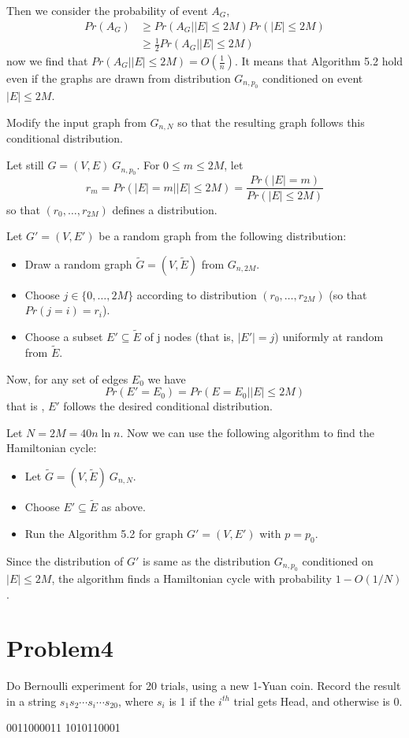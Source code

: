 \documentclass[12pt]{article}
\begin{document}
Then we consider the probability of event $A_G$,
\begin{equation}
    \begin{split}
    Pr(A_G) &\ge Pr(A_G | |E| \le 2M) Pr( |E| \le 2M)\\
    &\ge \frac{1}{2} Pr(A_G | |E| \le 2M)
    \end{split}
\end{equation}
now we find that $Pr(A_G | |E| \le 2M)=O(\frac{1}{n})$. It means that Algorithm 5.2 hold even if the graphs are drawn from distribution $G_{n,p_0}$ conditioned on event $|E| \le 2M$.

Modify the input graph from $G_{n,N}$ so that the resulting graph follows this conditional distribution.

Let still $G=(V,E) ~ G_{n, p_0}$. For $0\le m\le 2M$, let
\begin{equation}
    r_m=Pr(|E| = m | |E|\le 2M) = \frac{Pr(|E|=m)}{Pr(|E|\le 2M)}
\end{equation}
so that $(r_0, \dots, r_{2M})$ defines a distribution.

Let $G' = (V, E')$ be a random graph from the following distribution:
\begin{itemize}
    \item Draw a random graph $\tilde{G} = (V, \tilde{E})$ from $G_{n, 2M}$.
    \item Choose $j \in \{0,\dots, 2M\}$ according to distribution $(r_0, \dots, r_{2M})$ (so that $Pr(j=i)=r_i$).
    \item Choose a subset $E' \subseteq \tilde{E}$ of j nodes (that is, $|E'|=j$) uniformly at random from $\tilde{E}$.
\end{itemize}

Now, for any set of edges $E_0$ we have 
\begin{equation}
    Pr(E'=E_0) = Pr(E=E_0 | |E| \le 2M)
\end{equation}
that is , $E'$ follows the desired conditional distribution.

Let $N=2M=40n \ln n$. Now we can use the following algorithm to find the Hamiltonian cycle:
\begin{itemize}
    \item Let $\tilde{G} = (V,\tilde{E}) ~ G_{n, N}$.
    \item Choose $E' \subseteq \tilde{E}$ as above.
    \item Run the Algorithm 5.2 for graph $G' = (V, E')$ with $p=p_0$.
\end{itemize}

Since the distribution of $G'$ is same as the distribution $G_{n, p_0}$ conditioned on $|E| \le 2M$, the algorithm finds a Hamiltonian cycle with probability $1-O(1/N)$.

\section{Problem4}
Do Bernoulli experiment for 20 trials, using a new 1-Yuan coin. Record the result in a
string $s_1s_2 \cdots s_i \cdots s_{20}$, where $s_i$ is 1 if the $i^{th}$ trial gets Head, and otherwise is 0.

0011000011 1010110001
\end{document}
